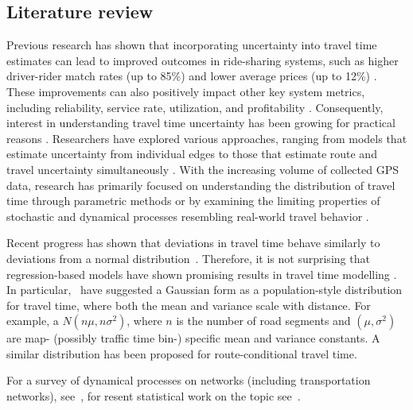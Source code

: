 \documentclass[12pt]{article}
\begin{document}
\subsection{Literature review}

Previous research has shown that incorporating uncertainty into travel time estimates can lead to improved outcomes in ride-sharing systems, such as higher driver-rider match rates (up to 85\%) and lower average prices (up to 12\%) \citep{long2018ride}. These improvements can also positively impact other key system metrics, including reliability, service rate, utilization, and profitability \citep{li2021vehicle, li2022pricing,li2022ride}. Consequently, interest in understanding travel time uncertainty has been growing for practical reasons \citep{westgate2013travel,wang2019simple, hunter2009path,westgate2016large}.  Researchers have explored various approaches, ranging from models that estimate uncertainty from individual edges \citep{zheng2013urban,jenelius2013travel} to those that estimate route and travel uncertainty simultaneously \citep{westgate2013travel,wang2019simple, hunter2009path,westgate2016large}. With the increasing volume of collected GPS data, research has primarily focused on understanding the distribution of travel time through parametric methods \citep{woodard2017predicting,guo2012multistate,ma2017estimation,zhang2019novel} or by examining the limiting properties of stochastic and dynamical processes resembling real-world travel behavior \cite{elmasri2020predictive, bolin2022gaussian}.

Recent progress has shown that deviations in travel time behave similarly to deviations from a normal distribution~\cite{elmasri2020predictive, woodard2017predicting}. Therefore, it is not surprising that regression-based models have shown promising results in travel time modelling \citep{westgate2016large, woodard2017predicting,budge2010empirical, westgate2013travel}. In particular,~\cite{elmasri2020predictive} have suggested a Gaussian form as a population-style distribution for travel time, where both the mean and variance scale with distance. For example, a \(N(n\mu, n\sigma^{2})\), where \(n\) is the number of road segments and \((\mu, \sigma^{2})\) are map- (possibly traffic time bin-) specific mean and variance constants. A similar distribution has been proposed for route-conditional travel time. 


For a survey of dynamical processes on networks (including transportation networks), see~\citet[ch. 11]{barrat2008dynamical}, for resent statistical work on the topic see~\citep{kolaczyk2014statistical, snijders2017modeling,burk2007beyond, britton2002bayesian,golightly2005bayesian, bolin2022gaussian}. 
\end{document}
